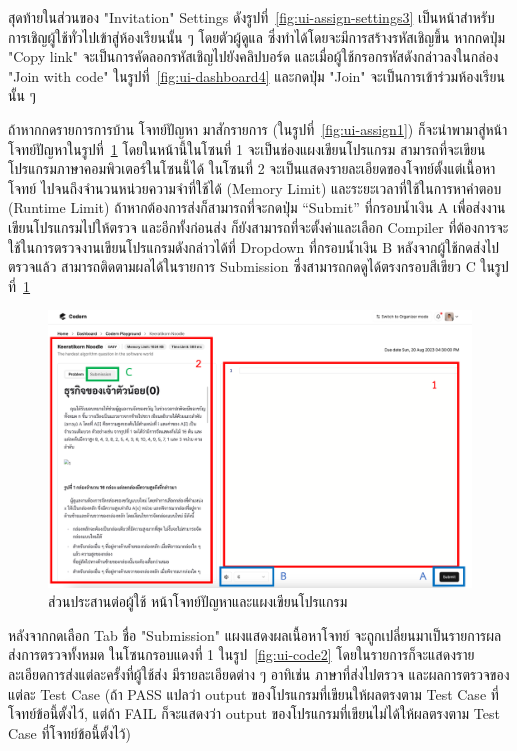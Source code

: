\documentclass[12pt,one side,openright,a4paper]{cpe-thesis-th}
\newcommand{\thaijustify}[1]{%
  \par\hspace{30pt}\justifying
  #1
}
\begin{document}
    \thaijustify{
        สุดท้ายในส่วนของ "Invitation" Settings ดังรูปที่~\ref{fig:ui-assign-settings3} เป็นหน้าสำหรับการเชิญผู้ใช้ทั่วไปเข้าสู่ห้องเรียนนั้น ๆ โดยตัวผู้ดูแล ซึ่งทำได้โดยจะมีการสร้างรหัสเชิญขึ้น หากกดปุ่ม "Copy link" จะเป็นการคัดลอกรหัสเชิญไปยังคลิปบอร์ด และเมื่อผู้ใช้กรอกรหัสดังกล่าวลงในกล่อง "Join with code" ในรูปที่~\ref{fig:ui-dashboard4} และกดปุ่ม "Join" จะเป็นการเข้าร่วมห้องเรียนนั้น ๆ
    }
    \thaijustify{
        ถ้าหากกดรายการการบ้าน โจทย์ปัญหา มาสักรายการ (ในรูปที่~\ref{fig:ui-assign1}) ก็จะนำพามาสู่หน้าโจทย์ปัญหาในรูปที่~\ref{fig:ui-code1} โดยในหน้านี้ในโซนที่ 1 จะเป็นช่องแผงเขียนโปรแกรม สามารถที่จะเขียนโปรแกรมภาษาคอมพิวเตอร์ในโซนนี้ได้ ในโซนที่ 2 จะเป็นแสดงรายละเอียดของโจทย์ตั้งแต่เนื้อหาโจทย์ ไปจนถึงจำนวนหน่วยความจำที่ใช้ได้ (Memory Limit) และระยะเวลาที่ใช้ในการหาคำตอบ (Runtime Limit) ถ้าหากต้องการส่งก็สามารถที่จะกดปุ่ม “Submit” ที่กรอบน้ำเงิน A เพื่อส่งงานเขียนโปรแกรมไปให้ตรวจ และอีกทั้งก่อนส่ง ก็ยังสามารถที่จะตั้งค่าและเลือก Compiler ที่ต้องการจะใช้ในการตรวจงานเขียนโปรแกรมดังกล่าวได้ที่ Dropdown ที่กรอบน้ำเงิน B หลังจากผู้ใช้กดส่งไปตรวจแล้ว สามารถติดตามผลได้ในรายการ Submission ซึ่งสามารถกดดูได้ตรงกรอบสีเขียว C ในรูปที่~\ref{fig:ui-code1} 
    }
    \hypertarget{ui-code1}{
        \begin{figure}[H]
        \centering
            \includegraphics[width=15cm]{figure/ui/ui-code1.png}
            \caption[ส่วนประสานต่อผู้ใช้ หน้าโจทย์ปัญหาและแผงเขียนโปรแกรม]{ส่วนประสานต่อผู้ใช้ หน้าโจทย์ปัญหาและแผงเขียนโปรแกรม}
            \label{fig:ui-code1}
        \end{figure}
    }
    \thaijustify{
        หลังจากกดเลือก Tab ชื่อ "Submission" แผงแสดงผลเนื้อหาโจทย์ จะถูกเปลี่ยนมาเป็นรายการผลส่งการตรวจทั้งหมด ในโซนกรอบแดงที่ 1 ในรูป~\ref{fig:ui-code2} โดยในรายการก็จะแสดงรายละเอียดการส่งแต่ละครั้งที่ผู้ใช้ส่ง มีรายละเอียดต่าง ๆ อาทิเช่น ภาษาที่ส่งไปตรวจ และผลการตรวจของแต่ละ Test Case (ถ้า PASS แปลว่า output ของโปรแกรมที่เขียนให้ผลตรงตาม Test Case ที่โจทย์ข้อนี้ตั้งไว้, แต่ถ้า FAIL ก็จะแสดงว่า output ของโปรแกรมที่เขียนไม่ได้ให้ผลตรงตาม Test Case ที่โจทย์ข้อนี้ตั้งไว้)
    }
\end{document}

